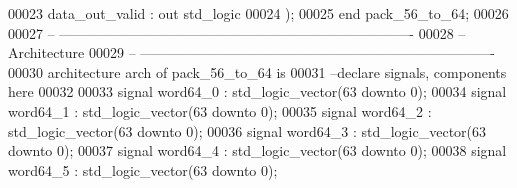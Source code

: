 \begin{DoxyCode}
00023       \textcolor{vhdlchar}{data_out_valid} \textcolor{vhdlchar}{:} \textcolor{keywordflow}{out} \textcolor{comment}{std\_logic}
00024       \textcolor{vhdlchar}{)};
00025 \textcolor{keywordflow}{end} \textcolor{vhdlchar}{pack\_56\_to\_64};
00026 
00027 \textcolor{keyword}{-- ----------------------------------------------------------------------------}
00028 \textcolor{keyword}{-- Architecture}
00029 \textcolor{keyword}{-- ----------------------------------------------------------------------------}
00030 \textcolor{keywordflow}{architecture} arch \textcolor{keywordflow}{of} pack_56_to_64 is
00031 \textcolor{keyword}{--declare signals,  components here}
00032 
00033 \textcolor{keywordflow}{signal} \textcolor{vhdlchar}{word64_0}               \textcolor{vhdlchar}{:} \textcolor{comment}{std\_logic\_vector}\textcolor{vhdlchar}{(}\textcolor{vhdllogic}{}\textcolor{vhdllogic}{63} \textcolor{keywordflow}{downto} \textcolor{vhdllogic}{}\textcolor{vhdllogic}{0}\textcolor{vhdlchar}{)};
00034 \textcolor{keywordflow}{signal} \textcolor{vhdlchar}{word64_1}               \textcolor{vhdlchar}{:} \textcolor{comment}{std\_logic\_vector}\textcolor{vhdlchar}{(}\textcolor{vhdllogic}{}\textcolor{vhdllogic}{63} \textcolor{keywordflow}{downto} \textcolor{vhdllogic}{}\textcolor{vhdllogic}{0}\textcolor{vhdlchar}{)};
00035 \textcolor{keywordflow}{signal} \textcolor{vhdlchar}{word64_2}               \textcolor{vhdlchar}{:} \textcolor{comment}{std\_logic\_vector}\textcolor{vhdlchar}{(}\textcolor{vhdllogic}{}\textcolor{vhdllogic}{63} \textcolor{keywordflow}{downto} \textcolor{vhdllogic}{}\textcolor{vhdllogic}{0}\textcolor{vhdlchar}{)};
00036 \textcolor{keywordflow}{signal} \textcolor{vhdlchar}{word64_3}               \textcolor{vhdlchar}{:} \textcolor{comment}{std\_logic\_vector}\textcolor{vhdlchar}{(}\textcolor{vhdllogic}{}\textcolor{vhdllogic}{63} \textcolor{keywordflow}{downto} \textcolor{vhdllogic}{}\textcolor{vhdllogic}{0}\textcolor{vhdlchar}{)};
00037 \textcolor{keywordflow}{signal} \textcolor{vhdlchar}{word64_4}               \textcolor{vhdlchar}{:} \textcolor{comment}{std\_logic\_vector}\textcolor{vhdlchar}{(}\textcolor{vhdllogic}{}\textcolor{vhdllogic}{63} \textcolor{keywordflow}{downto} \textcolor{vhdllogic}{}\textcolor{vhdllogic}{0}\textcolor{vhdlchar}{)};
00038 \textcolor{keywordflow}{signal} \textcolor{vhdlchar}{word64_5}               \textcolor{vhdlchar}{:} \textcolor{comment}{std\_logic\_vector}\textcolor{vhdlchar}{(}\textcolor{vhdllogic}{}\textcolor{vhdllogic}{63} \textcolor{keywordflow}{downto} \textcolor{vhdllogic}{}\textcolor{vhdllogic}{0}\textcolor{vhdlchar}{)};

\end{DoxyCode}
